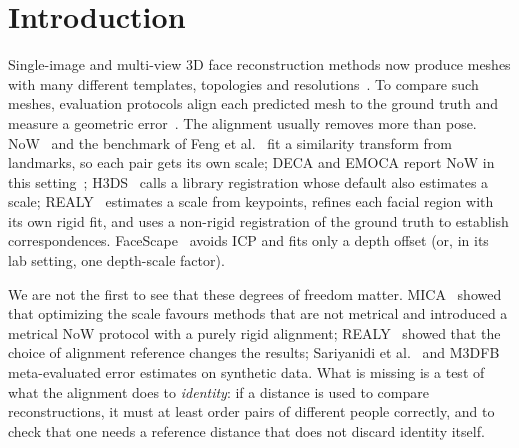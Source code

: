 \documentclass[10pt,twocolumn,letterpaper]{article}
\begin{document}
\section{Introduction}
\label{sec:intro}

Single-image and multi-view 3D face reconstruction methods now produce meshes with many different templates, topologies and resolutions~\cite{3ddfav2,deca,emoca,mica,deep3d,synergynet}. To compare such meshes, evaluation protocols align each predicted mesh to the ground truth and measure a geometric error~\cite{now,REALY,feng2018evaluation,facescape,ramon2021h3d}. The alignment usually removes more than pose. NoW~\cite{now} and the benchmark of Feng et al.~\cite{feng2018evaluation} fit a similarity transform from landmarks, so each pair gets its own scale; DECA and EMOCA report NoW in this setting~\cite{deca,emoca}; H3DS~\cite{ramon2021h3d} calls a library registration whose default also estimates a scale; REALY~\cite{REALY} estimates a scale from keypoints, refines each facial region with its own rigid fit, and uses a non-rigid registration of the ground truth to establish correspondences. FaceScape~\cite{zhu2023facescape} avoids ICP and fits only a depth offset (or, in its lab setting, one depth-scale factor).

We are not the first to see that these degrees of freedom matter. MICA~\cite{mica} showed that optimizing the scale favours methods that are not metrical and introduced a metrical NoW protocol with a purely rigid alignment; REALY~\cite{REALY} showed that the choice of alignment reference changes the results; Sariyanidi et al.~\cite{10448898} and M3DFB~\cite{fg2025} meta-evaluated error estimates on synthetic data. What is missing is a test of what the alignment does to \emph{identity}: if a distance is used to compare reconstructions, it must at least order pairs of different people correctly, and to check that one needs a reference distance that does not discard identity itself.
\end{document}

